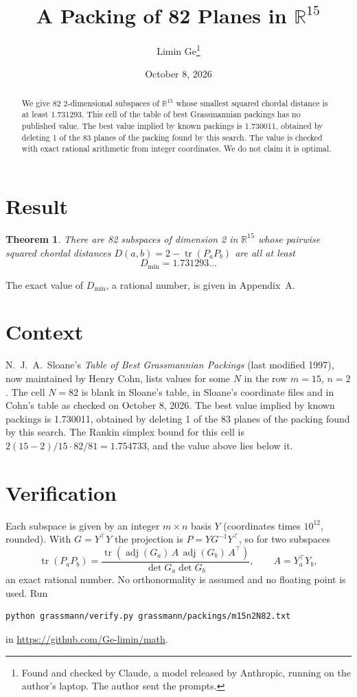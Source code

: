 \documentclass[11pt,a4paper]{article}
\title{A Packing of 82 Planes in $\mathbb{R}^{15}$}
\author{Limin Ge\thanks{Found and checked by Claude, a model released by Anthropic, running on the author's laptop. The author sent the prompts.}}
\date{October 8, 2026}
\newtheorem*{theorem}{Theorem}
\begin{document}
\maketitle
\begin{abstract}
We give 82 2-dimensional subspaces of $\mathbb{R}^{15}$ whose smallest squared chordal distance is at least 1.731293. This cell of the table of best Grassmannian packings has no published value. The best value implied by known packings is 1.730011, obtained by deleting 1 of the 83 planes of the packing found by this search. The value is checked with exact rational arithmetic from integer coordinates. We do not claim it is optimal.
\end{abstract}

\section{Result}
\begin{theorem}
There are 82 subspaces of dimension 2 in $\mathbb{R}^{15}$ whose pairwise squared chordal distances $D(a,b) = 2 - \operatorname{tr}(P_aP_b)$ are all at least
\[ D_{\min} = 1.731293\ldots \]
\end{theorem}
The exact value of $D_{\min}$, a rational number, is given in Appendix~A.


\section{Context}
N.~J.~A.~Sloane's \emph{Table of Best Grassmannian Packings} (last modified 1997), now maintained by Henry Cohn, lists values for some $N$ in the row $m=15$, $n=2$. The cell $N=82$ is blank in Sloane's table, in Sloane's coordinate files and in Cohn's table as checked on October 8, 2026. The best value implied by known packings is 1.730011, obtained by deleting 1 of the 83 planes of the packing found by this search. The Rankin simplex bound for this cell is $2(15-2)/15\cdot 82/81 = 1.754733$, and the value above lies below it.


\section{Verification}
Each subspace is given by an integer $m\times n$ basis $Y$ (coordinates times $10^{12}$, rounded). With $G=Y^\top Y$ the projection is $P=YG^{-1}Y^\top$, so for two subspaces
\[ \operatorname{tr}(P_aP_b)=\frac{\operatorname{tr}(\operatorname{adj}(G_a)\,A\,\operatorname{adj}(G_b)\,A^\top)}{\det G_a\det G_b},\qquad A=Y_a^\top Y_b, \]
an exact rational number. No orthonormality is assumed and no floating point is used. Run
\begin{verbatim}
python grassmann/verify.py grassmann/packings/m15n2N82.txt
\end{verbatim}
in \url{https://github.com/Ge-limin/math}.
\end{document}
